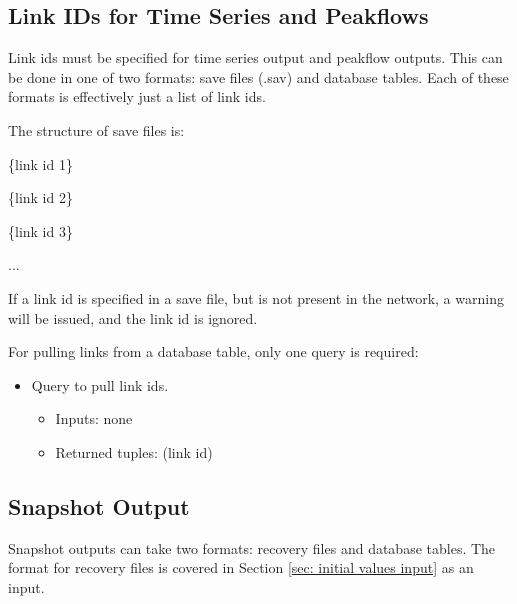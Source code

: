 \documentclass[12pt]{article}
\newenvironment{codeindent}
{\begin{list}{}
        {\setlength{\leftmargin}{.1in}}
        \item[]
}
{\end{list}}
\begin{document}
\subsection{Link IDs for Time Series and Peakflows} \label{sec: link ids for time series and peakflows}

Link ids must be specified for time series output and peakflow outputs. This can be done in one of two formats: save files (.sav) and database tables. Each of these formats is effectively just a list of link ids.

The structure of save files is:
\begin{codeindent}
 \{link id 1\}
 
 \{link id 2\}
 
 \{link id 3\}
 
 ...
\end{codeindent}
If a link id is specified in a save file, but is not present in the network, a warning will be issued, and the link id is ignored.

For pulling links from a database table, only one query is required:
\begin{itemize}
  \item Query to pull link ids.
  \begin{itemize}
   \item Inputs: none
   \item Returned tuples: (link id)
  \end{itemize}
\end{itemize}


\subsection{Snapshot Output} \label{sec: snapshot output}

Snapshot outputs can take two formats: recovery files and database tables. The format for recovery files is covered in Section \ref{sec: initial values input} as an input.
\end{document}
